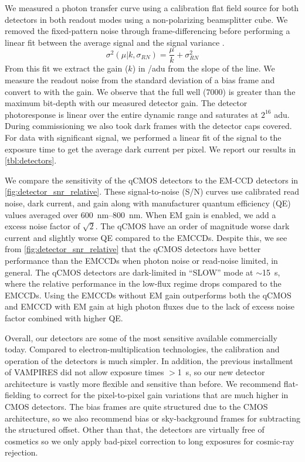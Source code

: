 We measured a photon transfer curve using a calibration flat field source for both detectors in both readout modes using a non-polarizing beamsplitter cube. We removed the fixed-pattern noise through frame-differencing before performing a linear fit between the average signal and the signal variance \citep{stefanov_cmos_2022}. 
\begin{equation}
    \sigma^2\left(\mu | k, \sigma_{RN}\right) = \frac{\mu}{k} + \sigma^2_{RN}
\end{equation}
From this fit we extract the gain ($k$) in \si{\electron/adu} from the slope of the line. We measure the readout noise from the standard deviation of a bias frame and convert to \si{\electron} with the gain. We observe that the full well (\SI{7000}{\electron}) is greater than the maximum bit-depth with our measured detector gain. The detector photoresponse is linear over the entire dynamic range and saturates at $2^{16}$ \si{adu}. During commissioning we also took dark frames with the detector caps covered. For data with significant signal, we performed a linear fit of the signal to the exposure time to get the average dark current per pixel. We report our results in \autoref{tbl:detectors}.

We compare the sensitivity of the qCMOS detectors to the EM-CCD detectors in \autoref{fig:detector_snr_relative}. These signal-to-noise (S/N) curves use calibrated read noise, dark current, and gain along with manufacturer quantum efficiency (QE) values averaged over \SIrange{600}{800}{nm}. When EM gain is enabled, we add a excess noise factor of $\sqrt{2}$. The qCMOS have an order of magnitude worse dark current and slightly worse QE compared to the EMCCDs. Despite this, we see from \autoref{fig:detector_snr_relative} that the qCMOS detectors have better performance than the EMCCDs when photon noise or read-noise limited, in general. The qCMOS detectors are dark-limited in ``SLOW'' mode at $\sim$\SI{15}{s}, where the relative performance in the low-flux regime drops compared to the EMCCDs. Using the EMCCDs without EM gain outperforms both the qCMOS and EMCCD with EM gain at high photon fluxes due to the lack of excess noise factor combined with higher QE.

Overall, our detectors are some of the most sensitive available commercially today. Compared to electron-multiplication technologies, the calibration and operation of the detectors is much simpler. In addition, the previous installment of VAMPIRES did not allow exposure times $>$\SI{1}{s}, so our new detector architecture is vastly more flexible and sensitive than before. We recommend flat-fielding to correct for the pixel-to-pixel gain variations that are much higher in CMOS detectors. The bias frames are quite structured due to the CMOS architecture, so we also recommend bias or sky-background frames for subtracting the structured offset. Other than that, the detectors are virtually free of cosmetics so we only apply bad-pixel correction to long exposures for cosmic-ray rejection.

